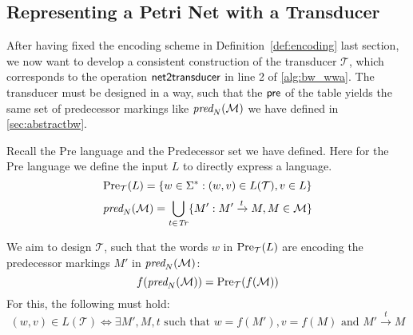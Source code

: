 \subsection{Representing a Petri Net with a Transducer}
After having fixed the encoding scheme in Definition~\autoref{def:encoding} last section, we now want to develop a consistent construction  of the transducer $\mathcal{T}$, which corresponds to the operation $\operatorname{\textsf{net2transducer}}$ in line 2 of \autoref{alg:bw_wwa}. 
The transducer must be designed in a way, such that the $\operatorname{\textsf{pre}}$ of the table yields the same set of predecessor markings like $\operatorname{\textit{pred}}_{N}(\mathcal{M})$  we have defined in \autoref{sec:abstractbw}.

\par

Recall the Pre language and the Predecessor set we have defined. Here for the Pre language we define the input $L$ to directly express a language.
\begin{equation*}
\operatorname{\text{Pre}}_{\mathcal{T}}(L) = \{ w \in \Sigma^{*}: (w,v) \in L(\mathcal{T}), v \in L \} 
\end{equation*}
\begin{equation*}
\operatorname{\textit{pred}}_{N}(\mathcal{M}) = \bigcup_{t \in \mathit{Tr}} \{M': M' \xrightarrow{t} M, M \in \mathcal{M} \}
\end{equation*}

We aim to design $\mathcal{T}$, such that the words $w$ in $\operatorname{\text{Pre}}_{\mathcal{T}}(L)$ are encoding the predecessor markings $M'$ in $\operatorname{\textit{pred}}_{N}(\mathcal{M})$:
\begin{equation*}
f(\operatorname{\textit{pred}}_{N}(\mathcal{M})) = \operatorname{\text{Pre}}_{\mathcal{T}}(f(\mathcal{M}))
\end{equation*}
For this, the following must hold:
\begin{equation*}
(w,v) \in L(\mathcal{T}) \iff \exists M',M, t \text{ such that } w = f(M'), v = f(M) \text{ and } M' \xrightarrow{t} M 
\end{equation*}



